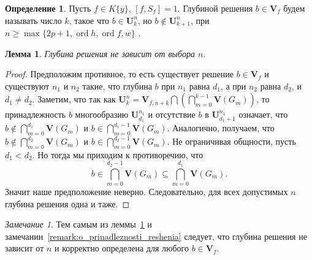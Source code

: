 \documentclass[16pt]{article}
\DeclareMathOperator{\ord}{ord}
\theoremstyle{plain1}
\newtheorem{lemma}[theorem1]{Лемма}
\theoremstyle{plain2}
\theoremstyle{plain}
\theoremstyle{plain3}
\theoremstyle{definition}
\newtheorem{definition}[theorem2]{Определение}
\theoremstyle{remark}
\newtheorem{remark}[theorem1]{Замечание}
\begin{document}
\begin{definition}
Пусть $f\in K\{y\}$, $[f,S_f]=1$.  Глубиной решения $b\in \mathbf{V}_f$  будем называть число $k$, такое что $b\in \mathbf{U}_k^n$, но $b\not\in \mathbf{U}_{k+1}^n$, при $n \geqslant\max\{ 2p+1,\ord{h},\ord{f},w\}$ .
\end{definition}



\begin{lemma}\label{lemma:o_nasledovanii}
Глубина решения не зависит от выбора $n$.

\end{lemma}

\begin{proof}
Предположим противное, то есть существует решение $b\in\mathbf{V}_f$ и существуют $n_1$ и $n_2$ такие, что  глубина $b$ при $n_1$  равна $d_1$, а при $n_2$ равна $d_2$, и $d_1\not=d_2$. Заметим, что так как $\mathbf{U}_k^n=\mathbf{V}_{f,n+k}\bigcap\left(\bigcap\limits_{m=0}^{k-1}\mathbf{V}\left(G_m\right)\right)$, то принадлежность $b$  многообразию $\mathbf{U}_{d_1}^{n_1}$ и отсутствие $b$ в $\mathbf{U}_{d_1+1}^{n_1}$ означает, что $b\not\in\bigcap\limits_{m=0}^{d_1}\mathbf{V}\left(G_m\right)$ и $b\in\bigcap\limits_{m=0}^{d_1-1}\mathbf{V}\left(G_m\right)$. Аналогично, получаем, что $b\not\in\bigcap\limits_{m=0}^{d_2}\mathbf{V}\left(G_m\right)$ и $b\in\bigcap\limits_{m=0}^{d_2-1}\mathbf{V}\left(G_m\right)$. Не ограничивая общности, пусть $d_1<d_2$. Но тогда мы приходим к противоречию, что 
$$
b\in\bigcap\limits_{m=0}^{d_2-1}\mathbf{V}\left(G_m\right)\subseteq\bigcap\limits_{m=0}^{d_1}\mathbf{V}\left(G_m\right).
$$
Значит наше предположение неверно. Следовательно, для всех  допустимых $n$ глубина решения одна и таже.

\end{proof}

\begin{remark}\label{remark:o_sushestvovanii_gllubiny} Тем самым из леммы~\ref{lemma:o_nasledovanii} и замечании~\ref{remark:o_prinadleznosti_reshenia} следует, что глубина решения не зависит от $n$ и корректно определена для любого $b\in \mathbf{V}_f$.
\end{remark}
\end{document}
